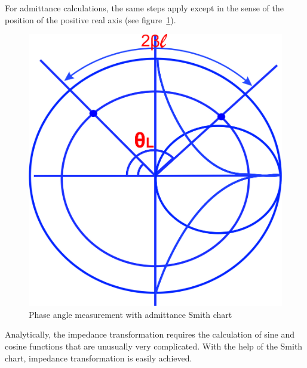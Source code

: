 For admittance calculations, the same steps apply except in the sense of the position of the positive real axis (see figure~\ref{fig:dfyui}).
\begin{figure}[h]
\centering
\includegraphics[width=0.7\linewidth]{./graphics/dfyui}
\caption{Phase angle measurement with admittance Smith chart}
\label{fig:dfyui}
\end{figure}

Analytically, the impedance transformation requires the calculation of sine and cosine functions that are unusually very complicated. With the help of the Smith chart, impedance transformation is easily achieved.

